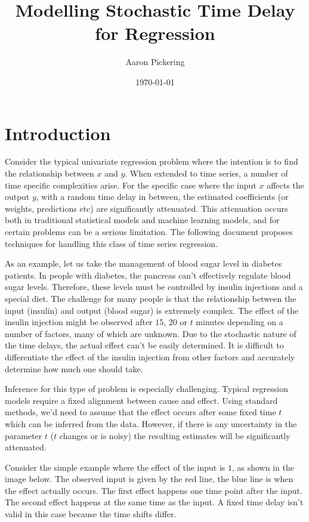 \documentclass[11pt]{amsart}
\begin{document}
\title{Modelling Stochastic Time Delay for Regression}
\author{Aaron Pickering}
\date{\today}
\maketitle

\section{Introduction}

Consider the typical univariate regression problem where the intention is to find the relationship between $x$ and $y$. When extended to time series, a number of time specific complexities arise. For the specific case where the input $x$ affects the output $y$, with a random time delay in between, the estimated coefficients (or weights, predictions etc) are significantly attenuated. This attenuation occurs both in traditional statistical models and machine learning models, and for certain problems can be a serious limitation. The following document proposes techniques for handling this class of time series regression.

As an example, let us take the management of blood sugar level in diabetes patients. In people with diabetes, the pancreas can't effectively regulate blood sugar levels. Therefore, these levels must be controlled by insulin injections and a special diet. The challenge for many people is that the relationship between the input (insulin) and output (blood sugar) is extremely complex. The effect of the insulin injection might be observed after $15$, $20$  or $t$ minutes depending on a number of factors, many of which are unknown. Due to the stochastic nature of the time delays, the actual effect can't be easily determined. It is difficult to differentiate the effect of the insulin injection from other factors and accurately determine how much one should take.

Inference for this type of problem is especially challenging. Typical regression models require a fixed alignment between cause and effect. Using standard methods, we'd need to assume that the effect occurs after some fixed time $t$ which can be inferred from the data. However, if there is any uncertainty in the parameter $t$ ($t$ changes or is noisy) the resulting estimates will be significantly attenuated.

Consider the simple example where the effect of the input is $1$, as shown in the image below. The observed input is given by the red line, the blue line is when the effect actually occurs. The first effect happens one time point after the input. The second effect happens at the same time as the input. A fixed time delay isn't valid in this case because the time shifts differ.
\end{document}
